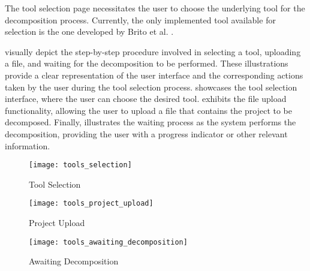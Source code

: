 The tool selection page necessitates the user to choose the underlying tool for
the decomposition process. Currently, the only implemented tool available for
selection is the one developed by Brito et al. .

visually depict the step-by-step procedure involved in selecting a tool,
uploading a file, and waiting for the decomposition to be performed. These
illustrations provide a clear representation of the user interface and the
corresponding actions taken by the user during the tool selection process.
 showcases the tool selection interface, where the user
can choose the desired tool.  exhibits the file upload
functionality, allowing the user to upload a file that contains the project to
be decomposed. Finally,  illustrates the
waiting process as the system performs the decomposition, providing the user
with a progress indicator or other relevant information.

\begin{figure*}[!htb]
  \caption{Tool Selection}
  \label{fig:tool_selection}
  \centering
  \texttt{[image: tools\_selection]}
\end{figure*}
\begin{figure*}[!htb]
  \caption{Project Upload}
  \label{fig:project_upload}
  \centering
  \texttt{[image: tools\_project\_upload]}
\end{figure*}
\begin{figure*}[!htb]
  \caption{Awaiting Decomposition}
  \label{fig:awaiting_decomposition}
  \centering
  \texttt{[image: tools\_awaiting\_decomposition]}
\end{figure*}
